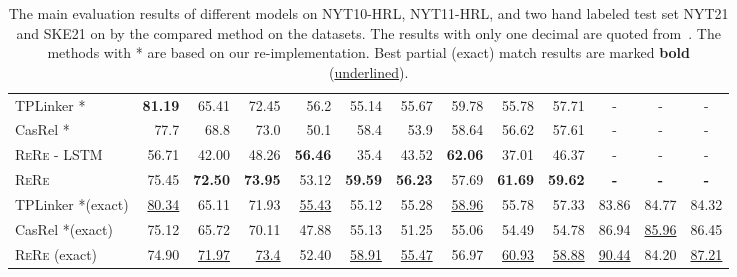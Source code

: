 \documentclass[11pt,a4paper]{article}
\newcommand{\mymethod}[0]{\textsc{ReRe} }
\begin{document}
\begin{table*}[ht!]
\begin{tabular}{p{4.2cm}rrrrrrrrrlll}
    TPLinker \cite{wang2020tplinker}* & \textbf{81.19} & 65.41    & 72.45    & 56.2     & 55.14    & 55.67    & 59.78    & 55.78    & 57.71    & \multicolumn{1}{c}{-} & \multicolumn{1}{c}{-} & \multicolumn{1}{c}{-} \\
    CasRel \cite{Wei2020ANC}* & 77.7     & 68.8     & 73.0       & 50.1     & 58.4     & 53.9     & 58.64    & 56.62    & 57.61    & \multicolumn{1}{c}{-} & \multicolumn{1}{c}{-} & \multicolumn{1}{c}{-} \\
    \midrule
    \mymethod - LSTM  & 56.71    & 42.00       & 48.26    & \textbf{56.46} & 35.4     & 43.52    & \textbf{62.06} & 37.01    & 46.37    & \multicolumn{1}{c}{-} & \multicolumn{1}{c}{-} & \multicolumn{1}{c}{-} \\
    \mymethod & 75.45    & \textbf{72.50} & \textbf{73.95} & 53.12    & \textbf{59.59} & \textbf{56.23} & 57.69    & \textbf{61.69} & \textbf{59.62} & \multicolumn{1}{c}{\textbf{-}} & \multicolumn{1}{c}{\textbf{-}} & \multicolumn{1}{c}{\textbf{-}} \\
    \midrule
    \midrule
    TPLinker \cite{wang2020tplinker}*(exact) & \underline{80.34} & 65.11    & 71.93    & \underline{55.43} & 55.12    & 55.28    & \underline{58.96} & 55.78    & 57.33    & 83.86    & 84.77    & 84.32 \\
    CasRel \cite{Wei2020ANC}*(exact) & 75.12    & 65.72    & 70.11    & 47.88    & 55.13    & 51.25    & 55.06    & 54.49    & 54.78    & 86.94    & \underline{85.96} & 86.45 \\
\mymethod (exact) & 74.90     & \underline{71.97} & \underline{73.4} & 52.40     & \underline{58.91} & \underline{55.47} & 56.97    & \underline{60.93} & \underline{58.88} & \underline{90.44} & 84.20     & \underline{87.21} \\
    \bottomrule
    \end{tabular}\addtolength{\tabcolsep}{2.5pt}
  \caption{The main evaluation results of different models on NYT10-HRL,  NYT11-HRL, and two hand labeled test set NYT21 and SKE21 on by the compared method on the datasets. 
  The results with only one decimal are quoted from~\cite{Wei2020ANC}. The methods with * are based on our re-implementation.
  Best partial (exact) match results are marked \textbf{bold} (\underline{underlined}). }
  \label{tab:overall}\end{table*}
\end{document}
